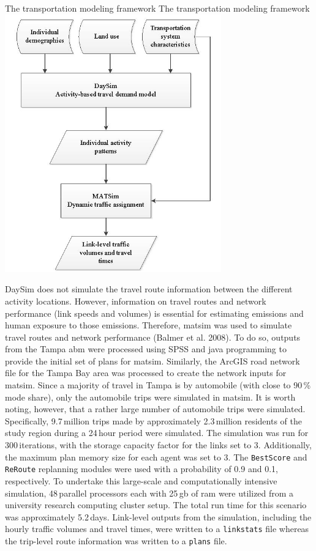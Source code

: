 \createfigure%
{The transportation modeling framework}%
{The transportation modeling framework}%
{\label{fig:tampa-fig2}}%
{\includegraphics[width=0.7\textwidth, angle=0]{./scenarios/figures/tampa-fig2.jpg}}%
{}

DaySim does not simulate the travel route information between the different activity locations. 
However, information on travel routes and network performance (\ie link speeds and volumes) is essential for estimating emissions and human exposure to those emissions. 
Therefore, \gls{matsim} was used to simulate travel routes and network performance \citep[][]{}(Balmer et al. 2008). 
To do so, outputs from the Tampa \gls{abm} were processed using SPSS and \gls{java} programming to provide the initial set of plans for \gls{matsim}. 
Similarly, the ArcGIS road network file for the Tampa Bay area was processed to create the network inputs for \gls{matsim}. 
Since a majority of travel in Tampa is by automobile (with close to 90\,\% mode share), only the automobile trips were simulated in \gls{matsim}. 
It is worth noting, however, that a rather large number of automobile trips were simulated. 
Specifically, 9.7\,million trips made by approximately 2.3\,million residents of the study region during a 24\,hour period were simulated. 
The simulation was run for 300\,iterations, with the storage capacity factor for the links set to 3. 
Additionally, the maximum plan memory size for each agent was set to 3. The \lstinline|BestScore| and \lstinline|ReRoute| replanning modules were used with a probability of 0.9 and 0.1, respectively. 
To undertake this large-scale and computationally intensive simulation, 48\,parallel processors each with 25\,\gls{gb} of \gls{ram} were utilized from a university research computing cluster setup. 
The total run time for this scenario was approximately 5.2\,days. 
Link-level outputs from the simulation, including the hourly traffic volumes and travel times, were written to a \lstinline|linkstats| file whereas the trip-level route information was written to a \lstinline|plans| file.

